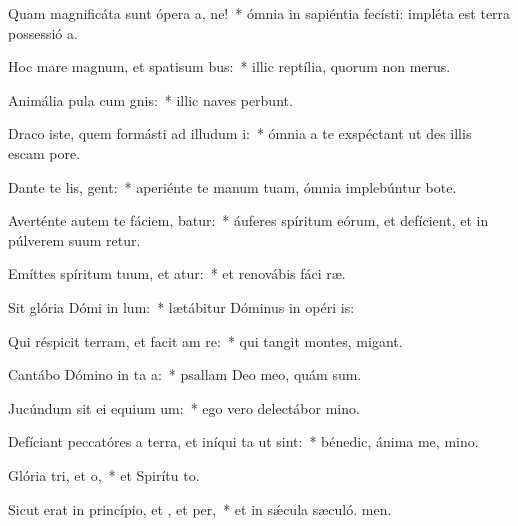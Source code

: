 \item Quam magnificáta sunt ópera a, ne!~* ómnia in sapiéntia fecísti: impléta est terra possessió a.
\item Hoc mare magnum, et spatisum bus:~* illic reptília, quorum non  merus.
\item Animália pula cum gnis:~* illic naves perbunt.
\item Draco iste, quem formásti ad illudum i:~* ómnia a te exspéctant ut des illis escam  pore.
\item Dante te lis, gent:~* aperiénte te manum tuam, ómnia implebúntur bote.
\item Averténte autem te fáciem, batur:~* áuferes spíritum eórum, et defícient, et in púlverem suum retur.
\item Emíttes spíritum tuum, et atur:~* et renovábis fáci ræ.
\item Sit glória Dómi in lum:~* lætábitur Dóminus in opéri is:
\item Qui réspicit terram, et facit am re:~* qui tangit montes,  migant.
\item Cantábo Dómino in ta a:~* psallam Deo meo, quám sum.
\item Jucúndum sit ei equium um:~* ego vero delectábor  mino.
\item Defíciant peccatóres a terra, et iníqui ta ut  sint:~* bénedic, ánima me, mino.
\item Glória tri, et o,~* et Spirítu to.
\item Sicut erat in princípio, et , et per,~* et in sǽcula sæculó. men.
